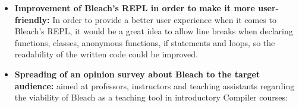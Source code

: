 \begin{itemize}
    \item \textbf{Improvement of Bleach's REPL in order to make it more user-friendly:} In order to provide a better user experience when it comes to Bleach's REPL, it would be a great idea to allow line breaks when declaring functions, classes, anonymous functions, if statements and loops, so the readability of the written code could be improved.

    \item \textbf{Spreading of an opinion survey about Bleach to the target audience:} aimed at professors, instructors and teaching assistants regarding the viability of Bleach as a teaching tool in introductory Compiler courses:
\end{itemize}
